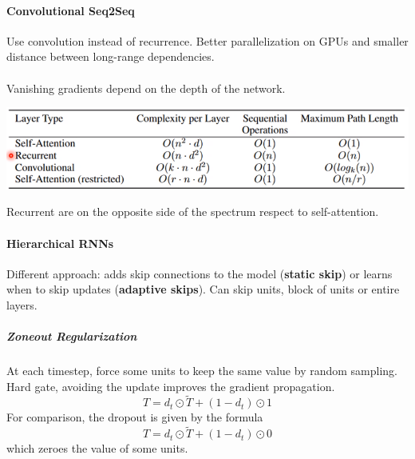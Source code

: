 \documentclass[10pt]{report}
\begin{document}
\paragraph{Convolutional Seq2Seq} Use convolution instead of recurrence. Better parallelization on GPUs and smaller distance between long-range dependencies.\\\\
Vanishing gradients depend on the depth of the network.
\begin{center}
	\includegraphics[scale=0.5]{121.png} %
\end{center}
Recurrent are on the opposite side of the spectrum respect to self-attention.
\paragraph{Hierarchical RNNs} Different approach: adds skip connections to the model (\textbf{static skip}) or learns when to skip updates (\textbf{adaptive skips}). Can skip units, block of units or entire layers.
\subparagraph{Zoneout Regularization} At each timestep, force some units to keep the same value by random sampling. Hard gate, avoiding the update improves the gradient propagation.
$$T = d_t\odot \tilde{T}+(1-d_t)\odot 1$$
For comparison, the dropout is given by the formula
$$T = d_t\odot\tilde{T}+(1-d_t)\odot 0$$
which zeroes the value of some units.
\end{document}
